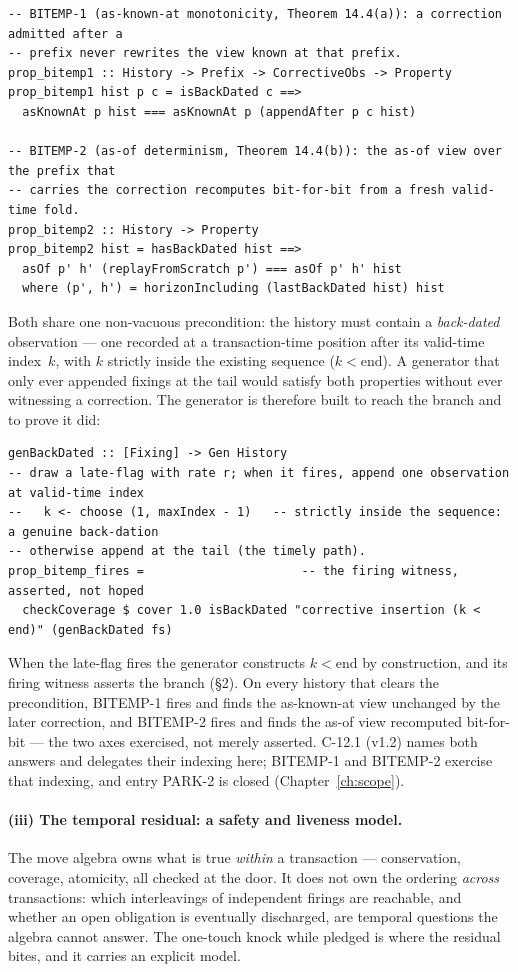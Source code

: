 \begin{lstlisting}
-- BITEMP-1 (as-known-at monotonicity, Theorem 14.4(a)): a correction admitted after a
-- prefix never rewrites the view known at that prefix.
prop_bitemp1 :: History -> Prefix -> CorrectiveObs -> Property
prop_bitemp1 hist p c = isBackDated c ==>
  asKnownAt p hist === asKnownAt p (appendAfter p c hist)

-- BITEMP-2 (as-of determinism, Theorem 14.4(b)): the as-of view over the prefix that
-- carries the correction recomputes bit-for-bit from a fresh valid-time fold.
prop_bitemp2 :: History -> Property
prop_bitemp2 hist = hasBackDated hist ==>
  asOf p' h' (replayFromScratch p') === asOf p' h' hist
  where (p', h') = horizonIncluding (lastBackDated hist) hist
\end{lstlisting}

Both share one non-vacuous precondition: the history must contain a \emph{back-dated}
observation --- one recorded at a transaction-time position after its valid-time index~$k$,
with $k$ strictly inside the existing sequence ($k < \text{end}$). A generator that only ever
appended fixings at the tail would satisfy both properties without ever witnessing a
correction. The generator is
therefore built to reach the branch and to prove it did:

\begin{lstlisting}
genBackDated :: [Fixing] -> Gen History
-- draw a late-flag with rate r; when it fires, append one observation at valid-time index
--   k <- choose (1, maxIndex - 1)   -- strictly inside the sequence: a genuine back-dation
-- otherwise append at the tail (the timely path).
prop_bitemp_fires =                      -- the firing witness, asserted, not hoped
  checkCoverage $ cover 1.0 isBackDated "corrective insertion (k < end)" (genBackDated fs)
\end{lstlisting}

When the late-flag fires the generator constructs $k<\text{end}$ by construction, and its
firing witness asserts the branch (\S 2). On every history that clears the precondition,
BITEMP-1 fires and finds the as-known-at view unchanged by the later correction, and BITEMP-2
fires and finds the as-of view recomputed bit-for-bit --- the two axes exercised, not merely
asserted. C-12.1 (v1.2) names both answers and delegates their indexing here; BITEMP-1 and BITEMP-2
exercise that indexing, and entry PARK-2 is closed (Chapter~\ref{ch:scope}).

\paragraph{(iii) The temporal residual: a safety and liveness model.}
The move algebra owns what is true \emph{within} a transaction --- conservation, coverage,
atomicity, all checked at the door. It does not own the ordering \emph{across} transactions:
which interleavings of independent firings are reachable, and whether an open obligation is
eventually discharged, are temporal questions the algebra cannot answer. The one-touch knock
while pledged is where the residual bites, and it carries an explicit model.

